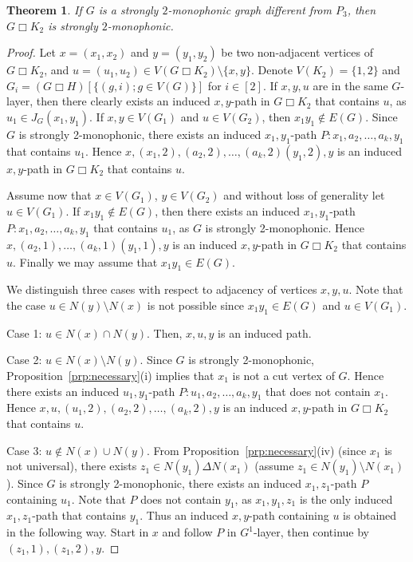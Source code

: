 \documentclass[a4paper,11pt]{article}
\newtheorem{theorem}{Theorem}
\begin{document}
\begin{theorem}\label{thm:productK2}
    If $G$ is a strongly $2$-monophonic graph different from $P_3$, then $G\Box K_2$ is strongly $2$-monophonic.
\end{theorem}
\begin{proof}
    Let $x=(x_1,x_2)$ and $y=(y_1,y_2)$ be two non-adjacent vertices of $G\Box K_2$, and $u=(u_1,u_2) \in V(G \Box K_2)\setminus \{x,y\}$. Denote $V(K_2)=\{1,2\}$ and $G_i=(G\Box H)[\{(g,i); g \in V(G)\}]$ for $i \in [2]$. If $x,y,u$ are in the same $G$-layer, then there clearly exists an induced $x,y$-path in $G \Box K_2$ that contains $u$, as $u_1 \in J_G(x_1,y_1)$. If $x,y\in V(G_1)$ and $u\in V(G_2)$, then $x_1y_1 \notin E(G)$. Since $G$ is strongly 2-monophonic, there exists an induced $x_1,y_1$-path $P:x_1,a_2,\ldots , a_k,y_1$ that contains $u_1$. Hence $x,(x_1,2),(a_2,2),\ldots , (a_k,2)(y_1,2),y$ is an induced $x,y$-path in $G \Box K_2$ that contains $u$. 
    
   
    Assume now that $x\in V(G_1)$, $y\in V(G_2)$ and without loss of generality let $u\in V(G_1)$. If $x_1y_1\notin E(G)$, then there exists an induced $x_1,y_1$-path $P:x_1,a_2,\ldots , a_k,y_1$ that contains $u_1$, as $G$ is strongly 2-monophonic. Hence $x,(a_2,1),\ldots , (a_k,1)(y_1,1),y$ is an induced $x,y$-path in $G \Box K_2$ that contains $u$. Finally we may assume that $x_1y_1 \in E(G)$. 
    
    We distinguish three cases with respect to adjacency of vertices $x,y,u$. Note that the case $u \in N(y) \setminus N(x)$ is not possible since $x_1y_1 \in E(G)$  and $u \in V(G_1)$. 
    
    Case 1: $u\in N(x)\cap N(y)$. Then, $x,u,y$ is an induced path. 

    Case 2: $u\in N(x)\setminus N(y)$. Since $G$ is strongly 2-monophonic, Proposition~\ref{prp:necessary}(i) implies that $x_1$ is not a cut vertex of $G$. Hence there exists an induced $u_1,y_1$-path $P:u_1,a_2,\ldots ,a_k,y_1$ that does not contain $x_1$. Hence $x,u,(u_1,2),(a_2,2),\ldots ,(a_k,2),y$ is an induced $x,y$-path in $G \Box K_2$ that contains $u$.

     Case 3: $u\notin N(x)\cup N(y)$. From Proposition~\ref{prp:necessary}(iv) (since $x_1$ is not universal), there exists $z_1\in N(y_1)\Delta N(x_1)$ (assume $z_1\in N(y_1)\setminus N(x_1)$). Since $G$ is strongly 2-monophonic, there exists an induced $x_1,z_1$-path $P$ containing $u_1$. Note that $P$ does not contain $y_1$, as $x_1,y_1,z_1$ is the only induced $x_1,z_1$-path that contains $y_1$. Thus an induced $x,y$-path containing $u$ is obtained in the following way. Start in $x$ and follow $P$ in $G^1$-layer, then continue by $(z_1,1),(z_1,2),y$. 
\end{proof}
\fi
\end{document}
